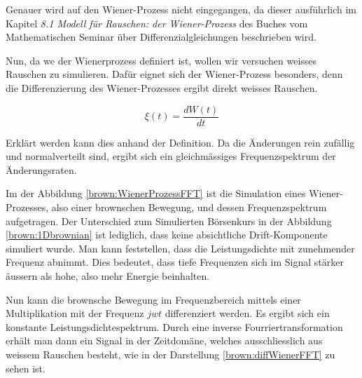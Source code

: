 Genauer wird auf den Wiener-Prozess nicht eingegangen, da dieser ausführlich im Kapitel \textit{8.1 Modell für Rauschen: der Wiener-Prozess} des Buches \cite{buch:brown:mathsem-differenzialgleichungen} vom Mathematischen Seminar über Differenzialgleichungen beschrieben wird.


Nun, da we der Wienerprozess definiert ist, wollen wir versuchen weisses Rauschen zu simulieren. Dafür eignet sich der Wiener-Prozess besonders, denn die Differenzierung des Wiener-Prozesses ergibt direkt weisses Rauschen.

\begin{equation}
	\xi(t) = \frac{dW(t)}{dt}
\end{equation}

Erklärt werden kann dies anhand der Definition. Da die Änderungen rein zufällig und normalverteilt sind, ergibt sich ein gleichmässiges Frequenzspektrum der Änderungsraten.


Im der Abbildung \ref{brown:WienerProzessFFT} ist die Simulation eines Wiener-Prozesses, also einer brownschen Bewegung, und dessen Frequenzspektrum aufgetragen. Der Unterschied zum Simulierten Börsenkurs in der Abbildung \ref{brown:1Dbrownian} ist lediglich, dass keine absichtliche Drift-Komponente simuliert wurde. Man kann feststellen, dass die Leistungsdichte mit zunehmender Frequenz abnimmt. Dies bedeutet, dass tiefe Frequenzen sich im Signal stärker äussern als hohe, also mehr Energie beinhalten.

Nun kann die brownsche Bewegung im Frequenzbereich mittels einer Multiplikation mit der Frequenz $ jwt $ differenziert werden. Es ergibt sich ein konstante Leistungsdichtespektrum. Durch eine inverse Fourriertransformation erhält man dann ein Signal in der Zeitdomäne, welches ausschliesslich aus weissem Rauschen besteht, wie in der Darstellung \ref{brown:diffWienerFFT} zu sehen ist.

